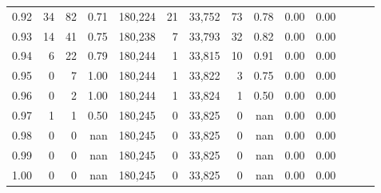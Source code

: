\begin{tabular}{rrrrrrrrrrrrrr}
0.92 &     34 &   82 &  0.71 &  180,224 &       21 &  33,752 &      73 &  0.78 &  0.00 &      0.00 \\
0.93 &     14 &   41 &  0.75 &  180,238 &        7 &  33,793 &      32 &  0.82 &  0.00 &      0.00 \\
0.94 &      6 &   22 &  0.79 &  180,244 &        1 &  33,815 &      10 &  0.91 &  0.00 &      0.00 \\
0.95 &      0 &    7 &  1.00 &  180,244 &        1 &  33,822 &       3 &  0.75 &  0.00 &      0.00 \\
0.96 &      0 &    2 &  1.00 &  180,244 &        1 &  33,824 &       1 &  0.50 &  0.00 &      0.00 \\
0.97 &      1 &    1 &  0.50 &  180,245 &        0 &  33,825 &       0 &   nan &  0.00 &      0.00 \\
0.98 &      0 &    0 &   nan &  180,245 &        0 &  33,825 &       0 &   nan &  0.00 &      0.00 \\
0.99 &      0 &    0 &   nan &  180,245 &        0 &  33,825 &       0 &   nan &  0.00 &      0.00 \\
1.00 &      0 &    0 &   nan &  180,245 &        0 &  33,825 &       0 &   nan &  0.00 &      0.00 \\
\bottomrule
\end{tabular}
